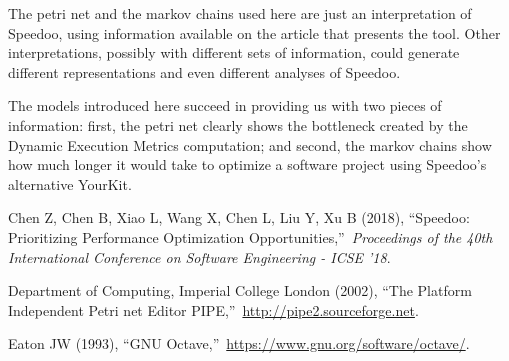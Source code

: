 \documentclass[11pt]{article}
\begin{document}
The petri net and the markov chains used here are just an interpretation of Speedoo, using information available on the article that presents the tool.
Other interpretations, possibly with different sets of information, could generate different representations and even different analyses of Speedoo.

The models introduced here succeed in providing us with two pieces of information:
first, the petri net clearly shows the bottleneck created by the Dynamic Execution Metrics computation;
and second, the markov chains show how much longer it would take to optimize a software project using Speedoo's alternative YourKit.

\begin{thebibliography}{99}
 
 Chen Z, Chen B, Xiao L, Wang X, Chen L, Liu Y, Xu B (2018), \textquotedblleft Speedoo: Prioritizing Performance Optimization Opportunities,\textquotedblright\ \textit{Proceedings of the 40th International Conference on Software Engineering  - ICSE '18}.

 Department of Computing, Imperial College London (2002), \textquotedblleft The Platform Independent Petri net Editor PIPE,\textquotedblright\ \url{http://pipe2.sourceforge.net}.

 Eaton JW (1993), \textquotedblleft GNU Octave,\textquotedblright\ \url{https://www.gnu.org/software/octave/}.


\end{thebibliography}
\end{document}

